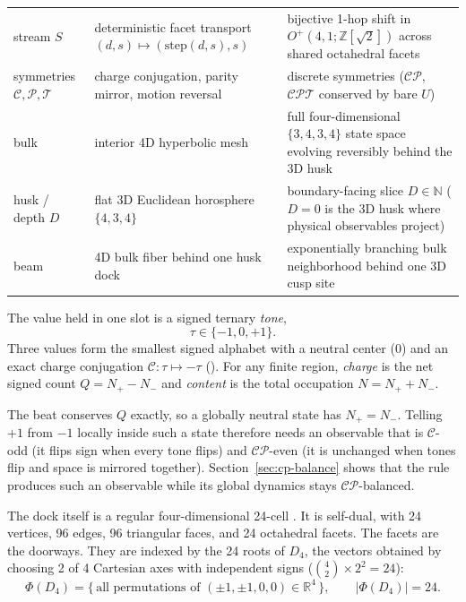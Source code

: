 \begin{table}[htbp]
\begin{tabularx}{\textwidth}{@{}>{\raggedright\arraybackslash}p{3.0cm}>{\raggedright\arraybackslash\hsize=0.85\hsize}X>{\raggedright\arraybackslash\hsize=1.15\hsize}X@{}}
stream $S$ & deterministic facet transport $(d, s) \mapsto (\mathrm{step}(d, s), s)$ & bijective 1-hop shift in $O^+(4,1; \mathbb{Z}[\sqrt{2}])$ across shared octahedral facets \\
\addlinespace[4pt]
symmetries $\mathcal{C}, \mathcal{P}, \mathcal{T}$ & charge conjugation, parity mirror, motion reversal & discrete symmetries ($\mathcal{CP}$, $\mathcal{CPT}$ conserved by bare $U$) \\
\addlinespace[4pt]
bulk & interior 4D hyperbolic mesh & full four-dimensional $\{3,4,3,4\}$ state space evolving reversibly behind the 3D husk \\
\addlinespace[4pt]
husk / depth $D$ & flat 3D Euclidean horosphere $\{4,3,4\}$ & boundary-facing slice $D \in \mathbb{N}$ ($D = 0$ is the 3D husk where physical observables project) \\
\addlinespace[4pt]
beam & 4D bulk fiber behind one husk dock & exponentially branching bulk neighborhood behind one 3D cusp site \\
\bottomrule
\end{tabularx}
\end{table}

The value held in one slot is a signed ternary \emph{tone},
\begin{equation}
\tau \in \{-1, 0, +1\}.
\label{eq:trits}
\end{equation}
Three values form the smallest signed alphabet with a neutral center ($0$) and an exact charge conjugation
$\mathcal{C}: \tau \mapsto -\tau$ (). For any finite region, \emph{charge} is the net signed count
$Q = N_+ - N_-$ and \emph{content} is the total occupation $N = N_+ + N_-$.

The beat conserves $Q$ exactly, so a globally neutral state has $N_+ = N_-$. Telling $+1$ from $-1$ locally inside such
a state therefore needs an observable that is $\mathcal{C}$-odd (it flips sign when every tone flips) and
$\mathcal{CP}$-even (it is unchanged when tones flip and space is mirrored together). Section~\ref{sec:cp-balance}
shows that the rule produces such an observable while its global dynamics stays $\mathcal{CP}$-balanced.

The dock itself is a regular four-dimensional 24-cell \cite{conway1999}. It is self-dual, with 24 vertices, 96 edges,
96 triangular faces, and 24 octahedral facets. The facets are the doorways. They are indexed by the 24 roots of $D_4$,
the vectors obtained by choosing 2 of 4 Cartesian axes with independent signs ($\binom{4}{2} \times 2^2 = 24$):
\begin{equation}
\Phi(D_4) = \bigl\{\,\text{all permutations of } (\pm 1, \pm 1, 0, 0) \in \mathbb{R}^4\,\bigr\},
\qquad |\Phi(D_4)| = 24.
\label{eq:d4-roots}
\end{equation}

